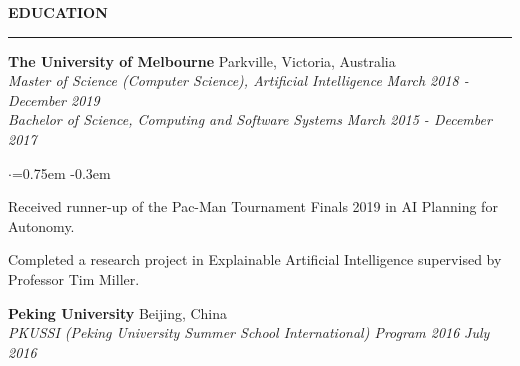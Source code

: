\documentclass{cv}
\def\sectionskip{\medskip}
\begin{document}
\sectionskip
{} \textbf{EDUCATION}
\sectionlineskip
\hrule
\begin{list}{}{\setlength{\leftmargin}{0em}}
\item[]
    \textbf{The University of Melbourne} \hfill {Parkville, Victoria, Australia}%
    \\
    {\em Master of Science (Computer Science), Artificial Intelligence} \hfill {\em March 2018 - December 2019}%
    \\
    {\em Bachelor of Science, Computing and Software Systems} \hfill {\em March 2015 - December 2017}%
    \begin{list}{$\cdot$}{\leftmargin=0.75em}
    \itemsep -0.3em \vspace{-0.3em}
        \item Received runner-up of the Pac-Man Tournament Finals 2019 in AI Planning for Autonomy.
        \item Completed a research project in Explainable Artificial Intelligence supervised by Professor Tim Miller.
    \end{list}
    \smallskip
\item[]
    \textbf{Peking University} \hfill {Beijing, China}%
    \\ 
    {\em PKUSSI (Peking University Summer School International) Program 2016} \hfill {\em July 2016}%
    \smallskip
\end{list}
\end{document}
